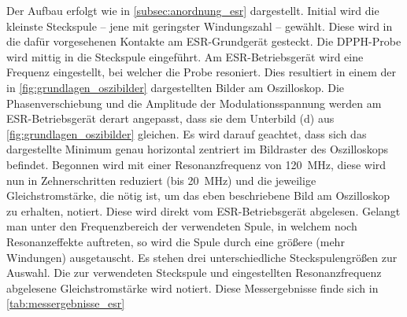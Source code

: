 \documentclass[ngerman]{scrartcl}
\begin{document}
Der Aufbau erfolgt wie in \autoref{subsec:anordnung_esr} dargestellt. Initial wird die kleinste Steckspule -- jene mit geringster Windungszahl -- gewählt. Diese wird in die dafür vorgesehenen Kontakte am ESR-Grundgerät gesteckt. Die DPPH-Probe wird mittig in die Steckspule eingeführt. Am ESR-Betriebsgerät wird eine Frequenz eingestellt, bei welcher die Probe resoniert. Dies resultiert in einem der in \autoref{fig:grundlagen_oszibilder} dargestellten Bilder am Oszilloskop. Die Phasenverschiebung und die Amplitude der Modulationsspannung werden am ESR-Betriebsgerät derart angepasst, dass sie dem Unterbild (d) aus \autoref{fig:grundlagen_oszibilder} gleichen. Es wird darauf geachtet, dass sich das dargestellte Minimum genau horizontal zentriert im Bildraster des Oszilloskops befindet. Begonnen wird mit einer Resonanzfrequenz von \SI{120}{MHz}, diese wird nun in Zehnerschritten reduziert (bis \SI{20}{MHz}) und die jeweilige Gleichstromstärke, die nötig ist, um das eben beschriebene Bild am Oszilloskop zu erhalten, notiert. Diese wird direkt vom ESR-Betriebsgerät abgelesen. Gelangt man unter den Frequenzbereich der verwendeten Spule, in welchem noch Resonanzeffekte auftreten, so wird die Spule durch eine größere (mehr Windungen) ausgetauscht. Es stehen drei unterschiedliche Steckspulengrößen zur Auswahl. Die zur verwendeten Steckspule und eingestellten Resonanzfrequenz abgelesene Gleichstromstärke wird notiert. Diese Messergebnisse finde sich in \autoref{tab:messergebnisse_esr}
%
\end{document}
